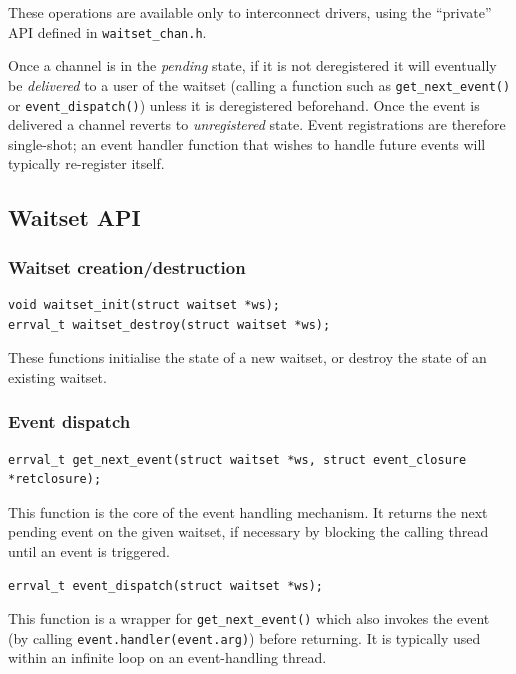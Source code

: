 \documentclass[a4paper,twoside]{report} %
\begin{document}
These operations are available only to interconnect drivers, using
the ``private'' API defined in \texttt{waitset\_chan.h}.

Once a channel is in the \emph{pending} state, if it is not deregistered it will
eventually be \emph{delivered} to a user of the waitset (calling
a function such as \lstinline+get_next_event()+ or \lstinline+event_dispatch()+)
unless it is deregistered beforehand. Once the event is delivered a channel
reverts to \emph{unregistered} state. Event registrations are therefore
single-shot; an event handler function that wishes to handle future events will
typically re-register itself.


\subsection{Waitset API}

\subsubsection{Waitset creation/destruction}

\begin{lstlisting}
void waitset_init(struct waitset *ws);
errval_t waitset_destroy(struct waitset *ws);
\end{lstlisting}

These functions initialise the state of a new waitset, or destroy the state
of an existing waitset.

\subsubsection{Event dispatch}

\begin{lstlisting}
errval_t get_next_event(struct waitset *ws, struct event_closure *retclosure);
\end{lstlisting}

This function is the core of the event handling mechanism. It returns the next
pending event on the given waitset, if necessary by blocking the calling
thread until an event is triggered.

\begin{lstlisting}
errval_t event_dispatch(struct waitset *ws);
\end{lstlisting}

This function is a wrapper for \lstinline+get_next_event()+ which also invokes
the event (by calling \lstinline+event.handler(event.arg)+) before returning.
It is typically used within an infinite loop on an event-handling thread.
\end{document}
